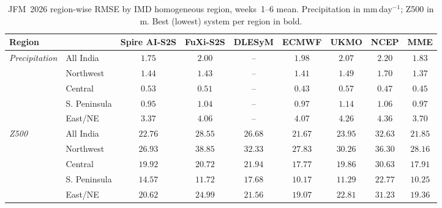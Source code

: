     \begin{table}[t]\centering
    \footnotesize
    \setlength{\tabcolsep}{3pt}
    \caption{JFM~2026 region-wise RMSE by IMD homogeneous region, weeks~1--6 mean. Precipitation in mm\,day$^{-1}$; Z500 in m. Best (lowest) system per region in bold.}
    \label{tab:reg_rmse}
    \begin{tabular}{llccccccc}\toprule
    Region & & Spire AI-S2S & FuXi-S2S & DLESyM & ECMWF & UKMO & NCEP & MME \\
    \midrule
    \multirow{5}{*}{\emph{Precipitation}} & All India    & $\mathbf{1.75}$ & $2.00$ & -- & $1.98$ & $2.07$ & $2.20$ & $1.83$ \\
 & Northwest    & $1.44$ & $1.43$ & -- & $1.41$ & $1.49$ & $1.70$ & $\mathbf{1.37}$ \\
 & Central      & $0.53$ & $0.51$ & -- & $\mathbf{0.43}$ & $0.57$ & $0.47$ & $0.45$ \\
 & S. Peninsula & $\mathbf{0.95}$ & $1.04$ & -- & $0.97$ & $1.14$ & $1.06$ & $0.97$ \\
 & East/NE      & $\mathbf{3.37}$ & $4.06$ & -- & $4.07$ & $4.26$ & $4.36$ & $3.70$ \\
\midrule
\multirow{5}{*}{\emph{Z500}} & All India    & $22.76$ & $28.55$ & $26.68$ & $\mathbf{21.67}$ & $23.95$ & $32.63$ & $21.85$ \\
 & Northwest    & $\mathbf{26.93}$ & $38.85$ & $32.33$ & $27.83$ & $30.26$ & $36.30$ & $28.16$ \\
 & Central      & $19.92$ & $20.72$ & $21.94$ & $\mathbf{17.77}$ & $19.86$ & $30.63$ & $17.91$ \\
 & S. Peninsula & $14.57$ & $11.72$ & $17.68$ & $\mathbf{10.17}$ & $11.29$ & $22.77$ & $10.25$ \\
 & East/NE      & $20.62$ & $24.99$ & $21.56$ & $\mathbf{19.07}$ & $22.81$ & $31.23$ & $19.36$ \\
    \bottomrule
    \end{tabular}\end{table}
